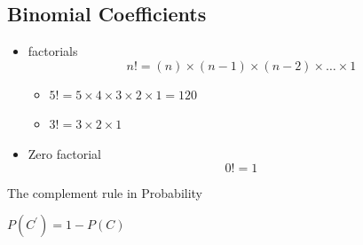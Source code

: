 \documentclass[12pt]{report}
\begin{document}
	\subsection*{Binomial Coefficients}
\begin{itemize}
	\item factorials 
	\[ n! = (n)\times (n-1)\times(n-2) \times \ldots \times 1 \]
	\begin{itemize}
		\item $5! = 5 \times 4 \times 3 \times 2 \times 1 = 120 $
		\item $3! = 3 \times 2 \times 1$
	\end{itemize}
	\item Zero factorial
	\[ 0! =  1 \]
\end{itemize}


The complement rule in Probability

$P(C^{\prime}) = 1- P(C)$
\end{document}

